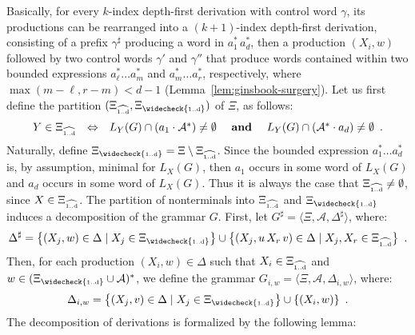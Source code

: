\documentclass[final]{llncs}
\renewcommand{\iff}{\Leftrightarrow}
\def\set#1{{\left\{ #1 \right\}}}
\def\tuple#1{{\langle #1 \rangle}}
\def\prod{\Delta}
\def\Vars{\ensuremath{\Xi}}
\def\Varsi{\ensuremath{\Xi_{\widecheck{\text{\tiny 1..d}}}}}
\def\Varse{\ensuremath{\Xi_{\widehat{\text{\tiny 1..d}}}}}
\begin{document}
Basically, for every $k$-index depth-first derivation with control
word $\gamma$, its productions can be rearranged into a $(k+1)$-index
depth-first derivation, consisting of a prefix $\gamma^\sharp$
producing a word in \(a_1^*\, a_d^*\), then a production \(
(X_i,w)\) followed by two control words $\gamma'$ and $\gamma''$ that
produce words contained within two bounded expressions
$a_\ell^* \ldots a_m^*$ and $a_m^* \ldots a_r^*$, respectively, where
$\max(m-\ell,r-m) < d-1$ (Lemma~\ref{lem:ginsbook-surgery}).
Let us first define the partition \((\Varse,\Varsi)\) of \(\Vars\), as
follows: {\setlength\abovedisplayskip{4pt}
\setlength\belowdisplayskip{4pt}
\[
\begin{array}{rclcl}
  Y \in \Varse & \iff &  L_{Y}(G)\cap (a_1 \cdot \mathcal{A}^*) \neq \emptyset & \text{ {\bf and} } &
  L_{Y}(G) \cap (\mathcal{A}^* \cdot a_d) \neq \emptyset\enspace.
    \end{array} \]}
Naturally, define \(\Varsi = \Vars \setminus \Varse\).
Since the bounded expression $a_1^* \ldots a_d^*$ is, by assumption, 
minimal for $L_X(G)$, then \(a_1\) occurs in some word of \(L_X(G)\)
and \(a_d\) occurs in some word of \(L_X(G)\). Thus it is always the
case that \(\Varse \neq \emptyset\), since \(X \in \Varse\). The
partition of nonterminals into $\Varse$ and $\Varsi$ induces a
decomposition of the grammar $G$. First, let $G^\sharp
= \tuple{\Vars,\mathcal{A},\prod^\sharp}$, where:
{\setlength\abovedisplayskip{4pt}
\setlength\belowdisplayskip{4pt}
\[
\prod^\sharp = \set{(X_j, w) \in \prod
\mid X_j \in \Varsi} \cup \set{(X_j, u \, X_r \, v) \in \prod \mid
X_j, X_r \in \Varse}\enspace.\]}
Then, for each production $(X_i,w)
\in \prod$ such that $X_i \in \Varse$ and $w \in (\Varsi \cup
\mathcal{A})^*$, we define the grammar $G_{i,w} = \tuple{ \Vars,
  \mathcal{A}, \prod_{i,w}}$, where:
{\setlength\abovedisplayskip{4pt}
\setlength\belowdisplayskip{4pt}
\[
\prod_{i,w} = \set{(X_j,v) \in \prod \mid X_j\in\Varsi} \cup \set{(X_i,w)}\enspace.
\]}
The decomposition of derivations is formalized by the following lemma: 
\end{document}
